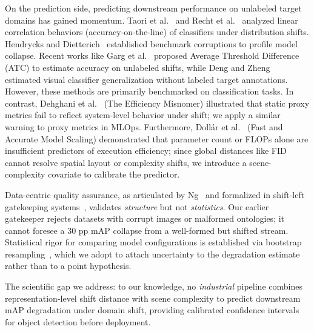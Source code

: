 \documentclass[10pt,twocolumn,letterpaper]{article}
\begin{document}
On the prediction side, predicting downstream performance on unlabeled target domains has gained momentum. Taori et al.~\cite{taori2020measuring} and Recht et al.~\cite{recht2019imagenet} analyzed linear correlation behaviors (accuracy-on-the-line) of classifiers under distribution shifts. Hendrycks and Dietterich~\cite{hendrycks2019benchmarking} established benchmark corruptions to profile model collapse. Recent works like Garg et al.~\cite{garg2022leveraging} proposed Average Threshold Difference (ATC) to estimate accuracy on unlabeled shifts, while Deng and Zheng~\cite{deng2021classifier} estimated visual classifier generalization without labeled target annotations. However, these methods are primarily benchmarked on classification tasks. In contrast, Dehghani et al.~\cite{dehghani2021efficiency} (The Efficiency Misnomer) illustrated that static proxy metrics fail to reflect system-level behavior under shift; we apply a similar warning to proxy metrics in MLOps. Furthermore, Doll\'ar et al.~\cite{dollar2021scaling} (Fast and Accurate Model Scaling) demonstrated that parameter count or FLOPs alone are insufficient predictors of execution efficiency; since global distances like FID cannot resolve spatial layout or complexity shifts, we introduce a scene-complexity covariate to calibrate the predictor.




Data-centric quality assurance, as articulated by Ng~\cite{ng2021data} and formalized in shift-left gatekeeping systems~\cite{greatexpectations2023}, validates \emph{structure} but not \emph{statistics}. Our earlier gatekeeper rejects datasets with corrupt images or malformed ontologies; it cannot foresee a 30 pp mAP collapse from a well-formed but shifted stream. Statistical rigor for comparing model configurations is established via bootstrap resampling~\cite{efron1994introduction,demsar2006statistical}, which we adopt to attach uncertainty to the degradation estimate rather than to a point hypothesis.

The scientific gap we address: to our knowledge, no \emph{industrial} pipeline combines representation-level shift distance with scene complexity to predict downstream mAP degradation under domain shift, providing calibrated confidence intervals for object detection before deployment.
\end{document}
